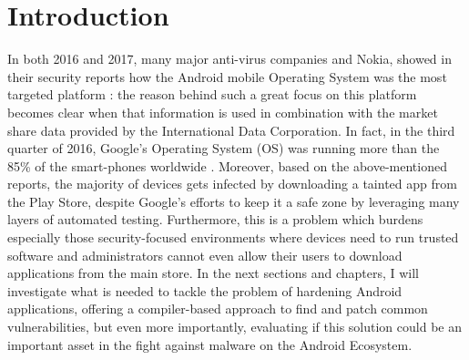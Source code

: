 \chapter{Introduction}
In both 2016 and 2017, many major anti-virus companies and Nokia, showed in their security reports how the Android mobile Operating System was the most targeted platform \cite{kaspersky} \cite{mcafee} \cite{nokia}: the reason behind such a great focus on this platform becomes clear when that information is used in combination with the market share data provided by the International Data Corporation. In fact, in the third quarter of 2016, Google's Operating System (OS) was running more than the 85\% of the smart-phones worldwide \cite{idcshare}. Moreover, based on the above-mentioned reports, the majority of devices gets infected by downloading a tainted app from the Play Store, despite Google's efforts to keep it a safe zone by leveraging many layers of automated testing. Furthermore, this is a problem which burdens especially those security-focused environments where devices need to run trusted software and administrators cannot even allow their users to download applications from the main store. In the next sections and chapters, I will investigate what is needed to tackle the problem of hardening Android applications, offering a compiler-based approach to find and patch common vulnerabilities, but even more importantly, evaluating if this solution could be an important asset in the fight against malware on the Android Ecosystem.

